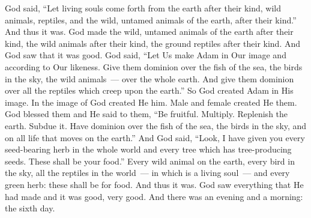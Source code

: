 \begin{inparaenum}
     God said, ``Let living souls come forth from the earth after their kind, wild animals, reptiles, and the wild, untamed animals of the earth, after their kind.'' And thus it was.%
     God made the wild, untamed animals of the earth after their kind, the wild animals after their kind, the ground reptiles after their kind. And God saw that it was good.%
     God said, ``Let Us make Adam in Our image and according to Our likeness. Give them dominion over the fish of the sea, the birds in the sky, the wild animals~--- over the whole earth. And give them dominion over all the reptiles which creep upon the earth.''%
     So God created Adam in His image. In the image of God created He him. Male and female created He them.%
     God blessed them and He said to them, ``Be fruitful. Multiply. Replenish the earth. Subdue it. Have dominion over the fish of the sea, the birds in the sky, and on all life that moves on the earth.''%
     And God said, ``Look, I have given you every seed-bearing herb in the whole world and every tree which has tree-producing seeds. These shall be your food.''%
     Every wild animal on the earth, every bird in the sky, all the reptiles in the world~--- in which is a living soul~--- and every green herb: these shall be for food. And thus it was.%
     God saw everything that He had made and it was good, very good. And there was an evening and a morning: the sixth day.%
\end{inparaenum}
